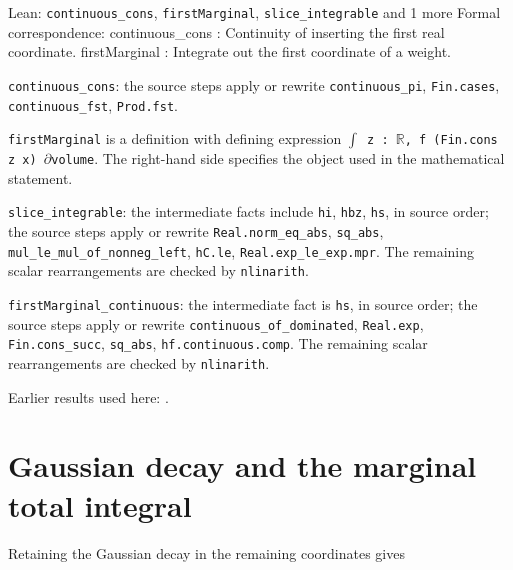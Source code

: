 \documentclass[11pt,a4paper]{article}
\begin{document}
\begin{leanbox}{Lean: \texttt{continuous\_\allowbreak{}cons}, \texttt{firstMarginal}, \texttt{slice\_\allowbreak{}integrable} and 1 more}
Formal correspondence: continuous\_cons : Continuity of inserting the first real coordinate. firstMarginal : Integrate out the first coordinate of a weight.



\texttt{continuous\_\allowbreak{}cons}: the source steps apply or rewrite \texttt{continuous\_\allowbreak{}pi}, \texttt{Fin.\allowbreak{}cases}, \texttt{continuous\_\allowbreak{}fst}, \texttt{Prod.\allowbreak{}fst}.



\texttt{first\allowbreak{}Marginal} is a definition with defining expression \texttt{\ensuremath{\int} z : \ensuremath{\mathbb R}, f (Fin.\allowbreak{}cons z x) \ensuremath{\partial}volume}. The right-hand side specifies the object used in the mathematical statement.



\texttt{slice\_\allowbreak{}integrable}: the intermediate facts include \texttt{hi}, \texttt{hbz}, \texttt{hs}, in source order; the source steps apply or rewrite \texttt{Real.\allowbreak{}norm\_\allowbreak{}eq\_\allowbreak{}abs}, \texttt{sq\_\allowbreak{}abs}, \texttt{mul\_\allowbreak{}le\_\allowbreak{}mul\_\allowbreak{}of\_\allowbreak{}nonneg\_\allowbreak{}left}, \texttt{h\allowbreak{}C.\allowbreak{}le}, \texttt{Real.\allowbreak{}exp\_\allowbreak{}le\_\allowbreak{}exp.\allowbreak{}mpr}. The remaining scalar rearrangements are checked by \texttt{nlinarith}.



\texttt{first\allowbreak{}Marginal\_\allowbreak{}continuous}: the intermediate fact is \texttt{hs}, in source order; the source steps apply or rewrite \texttt{continuous\_\allowbreak{}of\_\allowbreak{}dominated}, \texttt{Real.\allowbreak{}exp}, \texttt{Fin.\allowbreak{}cons\_\allowbreak{}succ}, \texttt{sq\_\allowbreak{}abs}, \texttt{hf.\allowbreak{}continuous.\allowbreak{}comp}. The remaining scalar rearrangements are checked by \texttt{nlinarith}.
\end{leanbox}


Earlier results used here: \cite[Section~3.26.4]{LangevinLean2026ULASC}.

\section{\texorpdfstring{Gaussian decay and the marginal total integral}{Gaussian decay and the marginal total integral}}


Retaining the Gaussian decay in the remaining coordinates gives
\end{document}
